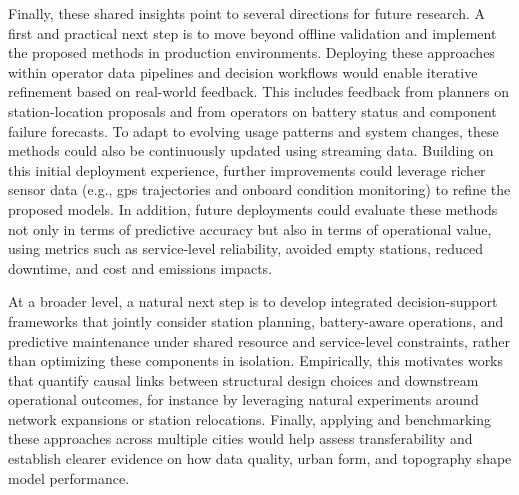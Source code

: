Finally, these shared insights point to several directions for future research. A first and practical next step is to move beyond offline validation and implement the proposed methods in production environments. Deploying these approaches within operator data pipelines and decision workflows would enable iterative refinement based on real-world feedback. This includes feedback from planners on station-location proposals and from operators on battery status and component failure forecasts. To adapt to evolving usage patterns and system changes, these methods could also be continuously updated using streaming data. Building on this initial deployment experience, further improvements could leverage richer sensor data (e.g., \ac{gps} trajectories and onboard condition monitoring) to refine the proposed models. In addition, future deployments could evaluate these methods not only in terms of predictive accuracy but also in terms of operational value, using metrics such as service-level reliability, avoided empty stations, reduced downtime, and cost and emissions impacts.

At a broader level, a natural next step is to develop integrated decision-support frameworks that jointly consider station planning, battery-aware operations, and predictive maintenance under shared resource and service-level constraints, rather than optimizing these components in isolation. Empirically, this motivates works that quantify causal links between structural design choices and downstream operational outcomes, for instance by leveraging natural experiments around network expansions or station relocations. Finally, applying and benchmarking these approaches across multiple cities would help assess transferability and establish clearer evidence on how data quality, urban form, and topography shape model performance.
